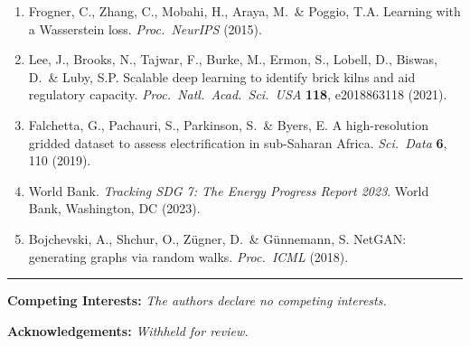 \documentclass[10pt,a4paper]{article}
\begin{document}
\begin{enumerate}[label={\arabic*.}, leftmargin=*, itemsep=2pt, topsep=2pt]
\item Frogner, C., Zhang, C., Mobahi, H., Araya, M.\ \& Poggio,
T.A. Learning with a Wasserstein loss. \emph{Proc.\ NeurIPS}
(2015).

\item Lee, J., Brooks, N., Tajwar, F., Burke, M., Ermon, S.,
Lobell, D., Biswas, D.\ \& Luby, S.P. Scalable deep learning to
identify brick kilns and aid regulatory capacity. \emph{Proc.\
Natl.\ Acad.\ Sci.\ USA} \textbf{118}, e2018863118 (2021).

\item Falchetta, G., Pachauri, S., Parkinson, S.\ \& Byers, E. A
high-resolution gridded dataset to assess electrification in
sub-Saharan Africa. \emph{Sci.\ Data} \textbf{6}, 110 (2019).

\item World Bank. \emph{Tracking SDG 7: The Energy Progress Report
2023}. World Bank, Washington, DC (2023).

\item Bojchevski, A., Shchur, O., Z\"ugner, D.\ \& G\"unnemann, S.
NetGAN: generating graphs via random walks.
\emph{Proc.\ ICML} (2018).
\end{enumerate}

\vspace{8pt}\textcolor{NEblue}{\rule{\linewidth}{0.4pt}}\par\vspace{4pt}

\noindent\textbf{\color{NEblue}Competing Interests:} \textit{The
authors declare no competing interests.}

\smallskip

\noindent\textbf{\color{NEblue}Acknowledgements:} \textit{Withheld
for review.}
\end{document}
